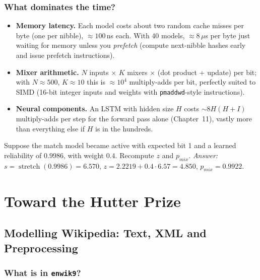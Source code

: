 \documentclass[11pt,a4paper,openany]{book}
\newcommand{\st}{\operatorname{stretch}}
\newcommand{\code}[1]{\texttt{#1}}
\theoremstyle{definition}
\theoremstyle{remark}
\begin{document}
\section{What dominates the time?}

\begin{itemize}
\item \textbf{Memory latency.} Each model costs about two random cache misses per byte (one per nibble), $\approx100$\,ns each. With 40 models, $\approx8\,\mu$s per byte just waiting for memory unless you \emph{prefetch} (compute next-nibble hashes early and issue prefetch instructions).
\item \textbf{Mixer arithmetic.} $N$ inputs $\times$ $K$ mixers $\times$ (dot product + update) per bit; with $N\approx500$, $K\approx10$ this is $\approx10^4$ multiply-adds per bit, perfectly suited to SIMD (16-bit integer inputs and weights with \code{pmaddwd}-style instructions).
\item \textbf{Neural components.} An LSTM with hidden size $H$ costs $\sim8H(H+I)$ multiply-adds per step for the forward pass alone (Chapter~11), vastly more than everything else if $H$ is in the hundreds.
\end{itemize}

\begin{exercise}
Suppose the match model became active with expected bit 1 and a learned reliability of $0.9986$, with weight $0.4$. Recompute $z$ and $p_{mix}$. \emph{Answer:} $s=\st(0.9986)=6.570$, $z=2.2219+0.4\cdot6.57=4.850$, $p_{mix}=0.9922$.
\end{exercise}


\part{Toward the Hutter Prize}

\chapter{Modelling Wikipedia: Text, XML and Preprocessing}

\section{What is in \code{enwik9}?}
\end{document}
